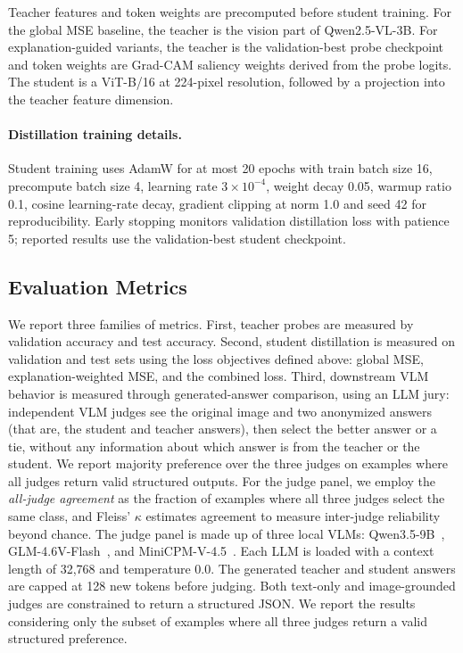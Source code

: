 Teacher features and token weights are precomputed before student training.
For the global MSE baseline, the teacher is the vision part of Qwen2.5-VL-3B.
For explanation-guided variants, the teacher is the validation-best probe checkpoint and token weights are Grad-CAM saliency weights derived from the probe logits.
The student is a ViT-B/16 at 224-pixel resolution, followed by a projection into the teacher feature dimension.

\paragraph{Distillation training details.}
Student training uses AdamW for at most 20 epochs with train batch size 16, precompute batch size 4, learning rate $3\times10^{-4}$, weight decay 0.05, warmup ratio 0.1, cosine learning-rate decay, gradient clipping at norm 1.0 and seed 42 for reproducibility.
Early stopping monitors validation distillation loss with patience 5; reported results use the validation-best student checkpoint.

\subsection{Evaluation Metrics}
\label{sec:metrics}


We report three families of metrics. First, teacher probes are measured by validation accuracy and test accuracy. Second, student distillation is measured on validation and test sets using the loss objectives defined above: global MSE, explanation-weighted MSE, and the combined loss. Third, downstream VLM behavior is measured through generated-answer comparison, using an LLM jury: independent VLM judges see the original image and two anonymized answers (that are, the student and teacher answers), then select the better answer or a tie, without any information about which answer is from the teacher or the student. We report majority preference over the three judges on examples where all judges return valid structured outputs. For the judge panel, we employ the \emph{all-judge agreement} as the fraction of examples where all three judges select the same class, and Fleiss' $\kappa$ estimates agreement to measure inter-judge reliability beyond chance. The judge panel is made up of three local VLMs: Qwen3.5-9B~\citep{qwen2026qwen35}, GLM-4.6V-Flash~\citep{vteam2025glm45v}, and MiniCPM-V-4.5~\citep{yu2025minicpmv45}.
Each LLM is loaded with a context length of 32,768 and temperature 0.0.
The generated teacher and student answers are capped at 128 new tokens before judging.
Both text-only and image-grounded judges are constrained to return a structured JSON.
We report the results considering only the subset of examples where all three judges return a valid structured preference.
